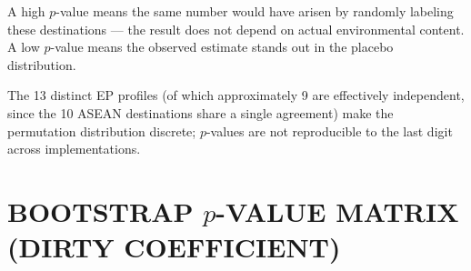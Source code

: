 \documentclass{article}
\begin{document}
\begin{table}[htbp]
\begin{threeparttable}
\begin{tablenotes}[flushleft]
\item A high $p$-value means the same number would have arisen by randomly labeling these destinations --- the result does not depend on actual environmental content. A low $p$-value means the observed estimate stands out in the placebo distribution.
\item The 13 distinct EP profiles (of which approximately 9 are effectively independent, since the 10 ASEAN destinations share a single agreement) make the permutation distribution discrete; $p$-values are not reproducible to the last digit across implementations.
\end{tablenotes}
\end{threeparttable}
\end{table}


\newpage
\section{BOOTSTRAP $p$-VALUE MATRIX (DIRTY COEFFICIENT)}
\end{document}
